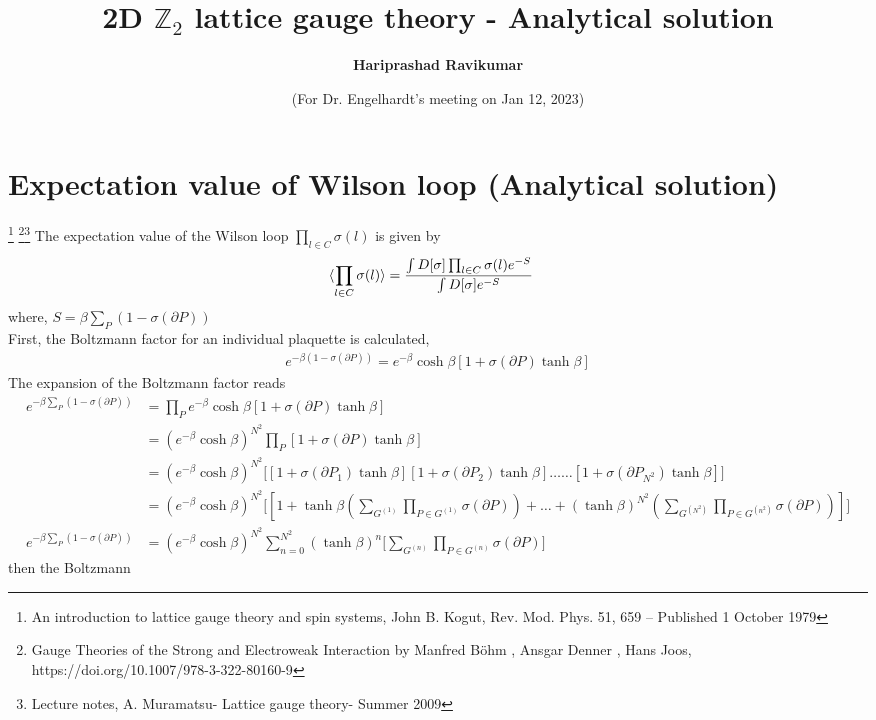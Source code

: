 \documentclass[]{article}
\title{2D $\mathbb{Z}_2$ lattice gauge theory - Analytical solution}
\author{\textbf{Hariprashad Ravikumar}}
\date{(For Dr. Engelhardt's meeting on Jan 12, 2023)}
\numberwithin{equation}{section}
\begin{document}
	\maketitle



\section{Expectation value of Wilson loop (Analytical solution)} \footnote{An introduction to lattice gauge theory and spin systems, John B. Kogut, Rev. Mod. Phys. 51, 659 – Published 1 October 1979} \footnote{ Gauge Theories of the Strong and Electroweak Interaction by Manfred Böhm , Ansgar Denner , Hans Joos, https://doi.org/10.1007/978-3-322-80160-9}\footnote{Lecture notes, A. Muramatsu- Lattice gauge theory- Summer 2009}
The expectation value of the Wilson loop $\prod_{l\in C} \sigma(l)$ is given by
\begin{align}
    \braket{\prod_{l\in C} \sigma(l)}&=\frac{\int D[\sigma]\prod_{l\in C}\sigma(l)e^{-S}}{\int D[\sigma]e^{-S}}
\end{align}
where, $S=\beta\sum_{P}(1-\sigma(\partial P))$\\
First, the Boltzmann factor for an individual plaquette is calculated, 
\begin{align}
    e^{-\beta(1-\sigma(\partial P))}=e^{-\beta}\cosh{\beta}[1+\sigma(\partial P)\tanh{\beta}]
\end{align}
The expansion of the Boltzmann factor reads 
\begin{align}
    e^{-\beta\sum_{P}(1-\sigma(\partial P))}&=\prod_{P}e^{-\beta}\cosh{\beta}[1+\sigma(\partial P)\tanh{\beta}]\\
    &=(e^{-\beta}\cosh{\beta})^{N^2}\prod_{P}[1+\sigma(\partial P)\tanh{\beta}]\\
    &=(e^{-\beta}\cosh{\beta})^{N^2}\Bigg[[1+\sigma(\partial P_1)\tanh{\beta}][1+\sigma(\partial P_2)\tanh{\beta}]\dots\dots[1+\sigma(\partial P_{N^2})\tanh{\beta}]\Bigg]\\
    &=(e^{-\beta}\cosh{\beta})^{N^2}\Bigg[[1+\tanh{\beta}\left(\sum_{G^{(1)}}\prod_{P\in G^{(1)}}\sigma(\partial P)\right)+\dots+(\tanh{\beta})^{N^2}\left(\sum_{G^{(N^2)}}\prod_{P\in G^{(n^2)}}\sigma(\partial P)\right)]\Bigg]\nonumber\\
    e^{-\beta\sum_{P}(1-\sigma(\partial P))}&=(e^{-\beta}\cosh{\beta})^{N^2}\sum_{n=0}^{N^2}(\tanh{\beta})^{n}\Bigg[\sum_{G^{(n)}}\prod_{P\in G^{(n)}}\sigma(\partial P)\Bigg]
\end{align}
then the Boltzmann
\end{document}
